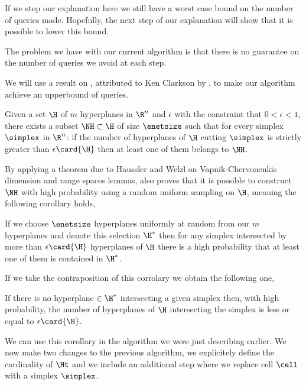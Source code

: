 
If we stop our explanation here we still have a worst case 
bound on the number of queries made. Hopefully, the next step of our
explanation will show that it is possible to lower this bound.

The problem we have with our current algorithm is that there is no guarantee
on the number of queries we avoid at each step.

We will use a result on \enets, attributed to Ken Clarkson by
\cite{burgisser:1997}, to make our algorithm achieve an upperbound
of  queries.

\begin{theorem}[Clarkson]
Given a set $\H$ of $m$ hyperplanes in $\R^n$ and $\epsilon$ with the
constraint that $0 < \epsilon < 1$, there exists a subset $\NH \subset \H$ of
size $\enetsize$ such that for every simplex $\simplex$ in $\R^n$: if the
number of hyperplanes of $\H$ cutting $\simplex$ is strictly greater than
$\epsilon \card{\H}$ then at least one of them belongs to $\NH$.
\end{theorem}

By applying a theorem due to Haussler and Welzl on Vapnik-Chervonenkis
dimension and range spaces lemmas, \cite{burgisser:1997} also proves that it is possible to
construct $\NH$ with high probability using a random uniform sampling on $\H$,
meaning the following corollary holds,

\begin{corollary}
If we choose $\enetsize$ hyperplanes uniformly at
random from our $m$ hyperplanes and denote this selection $\H^{*}$ then for
any simplex intersected by more than $\epsilon \card{\H}$ hyperplanes of $\H$
there is a high probability that at least one of them is contained in $\H^{*}$.
\end{corollary}

If we take the contraposition of this corrolary we obtain the following one,

\begin{corollary}
If there is no hyperplane $\in \H^{*}$ intersecting a given simplex then, with
high probability, the number of hyperplanes of $\H$ intersecting the simplex
is less or equal to $\epsilon \card{\H}$.
\end{corollary}

We can use this corollary in the algorithm we were just describing earlier. We
now make two changes to the previous algorithm, we explicitely define the
cardinality of $\Ht$ and we include an additional step where we replace cell
$\cell$ with a simplex $\simplex$.


